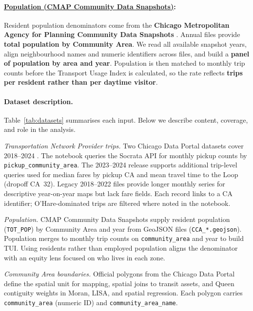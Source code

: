 \documentclass[10pt, a4paper]{article}
\newcommand{\datasettitle}[1]{\uline{#1}\penalty0\hspace{0pt}}
\begin{document}
\paragraph{\datasettitle{Population (CMAP Community Data Snapshots)}:} Resident population denominators come from the \textbf{Chicago Metropolitan Agency for Planning Community Data Snapshots} \cite{cmap_population}. Annual files provide \textbf{total population by Community Area}. We read all available snapshot years, align neighbourhood names and numeric identifiers across files, and build a \textbf{panel of population by area and year}. Population is then matched to monthly trip counts before the Transport Usage Index is calculated, so the rate reflects \textbf{trips per resident rather than per daytime visitor}.

\paragraph{Dataset description.}
Table~\ref{tab:datasets} summarises each input. Below we describe content, coverage, and role in the analysis.

\textit{Transportation Network Provider trips.} Two Chicago Data Portal datasets cover 2018--2024 \cite{chicago_tnp,chicago_tnp_legacy}. The notebook queries the Socrata API for monthly pickup counts by \texttt{pickup\_community\_area}. The 2023--2024 release supports additional trip-level queries used for median fares by pickup CA and mean travel time to the Loop (dropoff CA~32). Legacy 2018--2022 files provide longer monthly series for descriptive year-on-year maps but lack fare fields. Each record links to a CA identifier; O'Hare-dominated trips are filtered where noted in the notebook.

\textit{Population.} CMAP Community Data Snapshots \cite{cmap_population} supply resident population (\texttt{TOT\_POP}) by Community Area and year from GeoJSON files (\texttt{CCA\_*.geojson}). Population merges to monthly trip counts on \texttt{community\_area} and year to build TUI. Using residents rather than employed population aligns the denominator with an equity lens focused on who lives in each zone.

\textit{Community Area boundaries.} Official polygons from the Chicago Data Portal \cite{chicago_boundaries} define the spatial unit for mapping, spatial joins to transit assets, and Queen contiguity weights in Moran, LISA, and spatial regression. Each polygon carries \texttt{community\_area} (numeric ID) and \texttt{community\_area\_name}.
\end{document}
